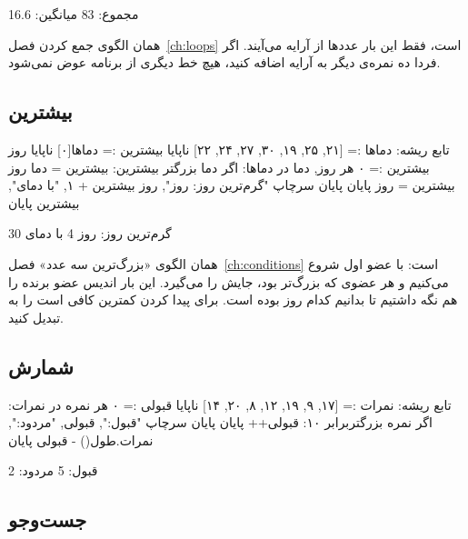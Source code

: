 \begin{outputfa}
مجموع: 83
میانگین: 16.6
\end{outputfa}

همان الگوی جمع کردن فصل~\ref{ch:loops} است، فقط این بار عددها از آرایه
می‌آیند. اگر فردا ده نمره‌ی دیگر به آرایه اضافه کنید، هیچ خط دیگری از
برنامه عوض نمی‌شود.

\subsection{بیشترین}

\begin{salamfa}
تابع ریشه:
    دماها := [۲۱, ۲۵, ۱۹, ۳۰, ۲۷, ۲۴, ۲۲]
    ناپایا بیشترین := دماها[۰]
    ناپایا روز بیشترین := ۰
    هر روز, دما در دماها:
        اگر دما بزرگتر بیشترین:
            بیشترین = دما
            روز بیشترین = روز
        پایان
    پایان
    سرچاپ "گرم‌ترین روز: روز", روز بیشترین + ۱, "با دمای", بیشترین
پایان
\end{salamfa}

\begin{outputfa}
گرم‌ترین روز: روز 4 با دمای 30
\end{outputfa}

همان الگوی «بزرگ‌ترین سه عدد» فصل~\ref{ch:conditions} است: با عضو اول
شروع می‌کنیم و هر عضوی که بزرگ‌تر بود، جایش را می‌گیرد. این بار اندیس عضو
برنده را هم نگه داشتیم تا بدانیم کدام روز بوده است. برای پیدا کردن کمترین
کافی است  را به  تبدیل کنید.

\subsection{شمارش}

\begin{salamfa}
تابع ریشه:
    نمرات := [۱۷, ۹, ۱۹, ۱۲, ۸, ۲۰, ۱۴]
    ناپایا قبولی := ۰
    هر نمره در نمرات:
        اگر نمره بزرگتربرابر ۱۰: قبولی++ پایان
    پایان
    سرچاپ "قبول:", قبولی, "مردود:", نمرات.طول() - قبولی
پایان
\end{salamfa}

\begin{outputfa}
قبول: 5 مردود: 2
\end{outputfa}

\subsection{جست‌وجو}

